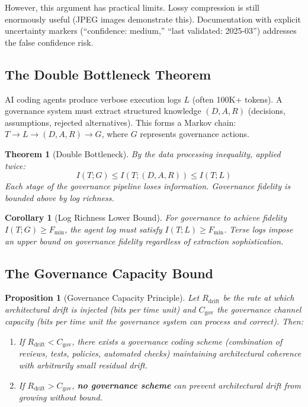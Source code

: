 \documentclass[11pt, a4paper, logo, copyright]{googledeepmind}
\newtheorem{theorem}{Theorem}[section]
\newtheorem{proposition}{Proposition}[section]
\newtheorem{corollary}{Corollary}[section]
\begin{document}
However, this argument has practical limits. Lossy compression is still enormously useful (JPEG images demonstrate this). Documentation with explicit uncertainty markers (``confidence: medium,'' ``last validated: 2025-03'') addresses the false confidence risk.

\subsection{The Double Bottleneck Theorem}

AI coding agents produce verbose execution logs $L$ (often 100K+ tokens). A governance system must extract structured knowledge $(D, A, R)$ (decisions, assumptions, rejected alternatives). This forms a Markov chain: $T \to L \to (D, A, R) \to G$, where $G$ represents governance actions.

\begin{theorem}[Double Bottleneck]
\label{thm:double-bottleneck}
By the data processing inequality, applied twice:
\begin{equation}
    I(T; G) \leq I(T; (D, A, R)) \leq I(T; L)
\end{equation}
Each stage of the governance pipeline loses information. Governance fidelity is bounded above by log richness.
\end{theorem}

\begin{corollary}[Log Richness Lower Bound]
For governance to achieve fidelity $I(T; G) \geq F_{\min}$, the agent log must satisfy $I(T; L) \geq F_{\min}$. Terse logs impose an upper bound on governance fidelity regardless of extraction sophistication.
\end{corollary}

\subsection{The Governance Capacity Bound}

\begin{proposition}[Governance Capacity Principle]
\label{thm:governance-capacity}
Let $R_{\text{drift}}$ be the rate at which architectural drift is injected (bits per time unit) and $C_{\text{gov}}$ the governance channel capacity (bits per time unit the governance system can process and correct). Then:
\begin{enumerate}
    \item If $R_{\text{drift}} < C_{\text{gov}}$, there exists a governance coding scheme (combination of reviews, tests, policies, automated checks) maintaining architectural coherence with arbitrarily small residual drift.
    \item If $R_{\text{drift}} > C_{\text{gov}}$, \textbf{no governance scheme} can prevent architectural drift from growing without bound.
\end{enumerate}
\end{proposition}
\end{document}
